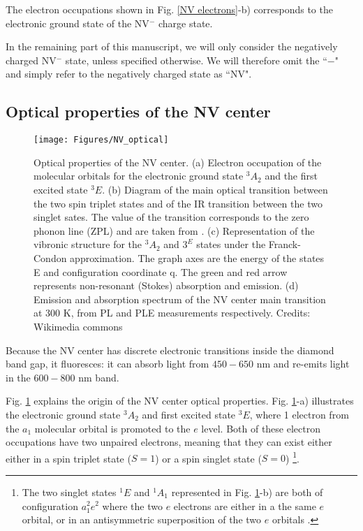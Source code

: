 \documentclass[a4paper,11pt]{report}
\begin{document}
The electron occupations shown in Fig. \ref{NV electrons}-b) corresponds to the electronic ground state of the NV$^-$ charge state.

In the remaining part of this manuscript, we will only consider the negatively charged NV$^-$ state, unless specified otherwise. We will therefore omit the ``$-$" and simply refer to the negatively charged state as ``NV".
\subsection{Optical properties of the NV center}
\begin{figure}[h!]
\centering
\texttt{[image: Figures/NV\_optical]}
\caption{Optical properties of the NV center. (a) Electron occupation of the molecular orbitals for the electronic ground state $^3A_2$ and the first excited state $^3E$. (b) Diagram of the main optical transition between the two spin triplet states and of the IR transition between the two singlet sates. The value of the transition corresponds to the zero phonon line (ZPL) and are taken from \citep{doherty2013nitrogen}. (c) Representation of the vibronic structure for the $^3A_2$ and $3^E$ states under the Franck-Condon approximation. The graph axes are the energy of the states E and configuration coordinate q. The green and red arrow represents non-resonant (Stokes) absorption and emission. (d) Emission and absorption spectrum of the NV center main transition at 300 K, from PL and PLE measurements respectively. Credits: Wikimedia commons}
\label{NV optical}
\end{figure}

Because the NV center has discrete electronic transitions inside the diamond band gap, it fluoresces: it can absorb light from $450-650$ nm and re-emits light in the $600-800$ nm band.

Fig. \ref{NV optical} explains the origin of the NV center optical properties. Fig. \ref{NV optical}-a) illustrates the electronic ground state $^3A_2$ and first excited state $^3E$, where 1 electron from the $a_1$ molecular orbital is promoted to the $e$ level. Both of these electron occupations have two unpaired electrons, meaning that they can exist either either in a spin triplet state ($S=1$) or a spin singlet state ($S=0$) \footnote{The two singlet states $^1E$ and $^1A_1$ represented in Fig. \ref{NV optical}-b) are both of configuration $a_1^2e^2$ where the two $e$ electrons are either in a the same $e$ orbital, or in an antisymmetric superposition of the two $e$ orbitals \citep{doherty2011negatively}.}. 
\end{document}
